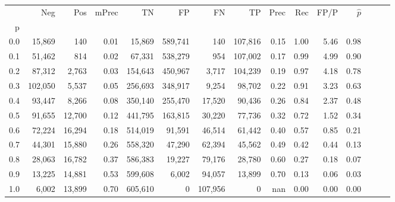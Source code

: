 \begin{tabular}{rrrrrrrrrrrrrrr}
\toprule
{} &      Neg &     Pos & mPrec &       TN &       FP &       FN &       TP &  Prec &   Rec &  FP/P & $\hat{p}$ \\
p   &          &         &       &          &          &          &          &       &       &       &           \\
\midrule
0.0 &   15,869 &     140 &  0.01 &   15,869 &  589,741 &      140 &  107,816 &  0.15 &  1.00 &  5.46 &      0.98 \\
0.1 &   51,462 &     814 &  0.02 &   67,331 &  538,279 &      954 &  107,002 &  0.17 &  0.99 &  4.99 &      0.90 \\
0.2 &   87,312 &   2,763 &  0.03 &  154,643 &  450,967 &    3,717 &  104,239 &  0.19 &  0.97 &  4.18 &      0.78 \\
0.3 &  102,050 &   5,537 &  0.05 &  256,693 &  348,917 &    9,254 &   98,702 &  0.22 &  0.91 &  3.23 &      0.63 \\
0.4 &   93,447 &   8,266 &  0.08 &  350,140 &  255,470 &   17,520 &   90,436 &  0.26 &  0.84 &  2.37 &      0.48 \\
0.5 &   91,655 &  12,700 &  0.12 &  441,795 &  163,815 &   30,220 &   77,736 &  0.32 &  0.72 &  1.52 &      0.34 \\
0.6 &   72,224 &  16,294 &  0.18 &  514,019 &   91,591 &   46,514 &   61,442 &  0.40 &  0.57 &  0.85 &      0.21 \\
0.7 &   44,301 &  15,880 &  0.26 &  558,320 &   47,290 &   62,394 &   45,562 &  0.49 &  0.42 &  0.44 &      0.13 \\
0.8 &   28,063 &  16,782 &  0.37 &  586,383 &   19,227 &   79,176 &   28,780 &  0.60 &  0.27 &  0.18 &      0.07 \\
0.9 &   13,225 &  14,881 &  0.53 &  599,608 &    6,002 &   94,057 &   13,899 &  0.70 &  0.13 &  0.06 &      0.03 \\
1.0 &    6,002 &  13,899 &  0.70 &  605,610 &        0 &  107,956 &        0 &   nan &  0.00 &  0.00 &      0.00 \\
\bottomrule
\end{tabular}
